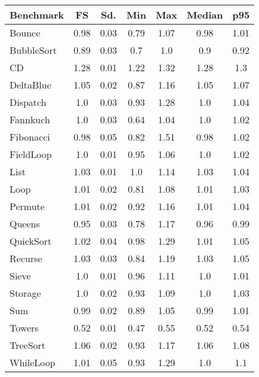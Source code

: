 \begin{center}
\begin{tabular}{l c c c c c c}
\toprule
\textbf{Benchmark} & \textbf{FS} & \textbf{Sd.} & \textbf{Min} & \textbf{Max} & \textbf{Median} & \textbf{p95}\\
\toprule

Bounce & 0.98 & 0.03 & 0.79 & 1.07 & 0.98 & 1.01 \\
\midrule

BubbleSort & 0.89 & 0.03 & 0.7 & 1.0 & 0.9 & 0.92 \\
\midrule

CD & 1.28 & 0.01 & 1.22 & 1.32 & 1.28 & 1.3 \\
\midrule

DeltaBlue & 1.05 & 0.02 & 0.87 & 1.16 & 1.05 & 1.07 \\
\midrule

Dispatch & 1.0 & 0.03 & 0.93 & 1.28 & 1.0 & 1.04 \\
\midrule

Fannkuch & 1.0 & 0.03 & 0.64 & 1.04 & 1.0 & 1.02 \\
\midrule

Fibonacci & 0.98 & 0.05 & 0.82 & 1.51 & 0.98 & 1.02 \\
\midrule

FieldLoop & 1.0 & 0.01 & 0.95 & 1.06 & 1.0 & 1.02 \\
\midrule

List & 1.03 & 0.01 & 1.0 & 1.14 & 1.03 & 1.04 \\
\midrule

Loop & 1.01 & 0.02 & 0.81 & 1.08 & 1.01 & 1.03 \\
\midrule

Permute & 1.01 & 0.02 & 0.92 & 1.16 & 1.01 & 1.04 \\
\midrule

Queens & 0.95 & 0.03 & 0.78 & 1.17 & 0.96 & 0.99 \\
\midrule

QuickSort & 1.02 & 0.04 & 0.98 & 1.29 & 1.01 & 1.05 \\
\midrule

Recurse & 1.03 & 0.03 & 0.84 & 1.19 & 1.03 & 1.05 \\
\midrule

Sieve & 1.0 & 0.01 & 0.96 & 1.11 & 1.0 & 1.01 \\
\midrule

Storage & 1.0 & 0.02 & 0.93 & 1.09 & 1.0 & 1.03 \\
\midrule

Sum & 0.99 & 0.02 & 0.89 & 1.05 & 0.99 & 1.01 \\
\midrule

Towers & 0.52 & 0.01 & 0.47 & 0.55 & 0.52 & 0.54 \\
\midrule

TreeSort & 1.06 & 0.02 & 0.93 & 1.17 & 1.06 & 1.08 \\
\midrule

WhileLoop & 1.01 & 0.05 & 0.93 & 1.29 & 1.0 & 1.1 \\
\midrule

\end{tabular}
\end{center}